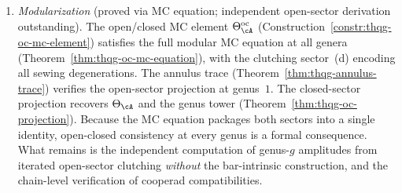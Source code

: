 \begin{enumerate}[label=\textup{(\arabic*)}, leftmargin=3.5em]
\item \emph{Modularization} (proved via MC equation; independent
 open-sector derivation outstanding).
 The open/closed MC element $\Theta^{\mathrm{oc}}_\cA$
 (Construction~\ref{constr:thqg-oc-mc-element}) satisfies the
 full modular MC equation at all genera
 (Theorem~\ref{thm:thqg-oc-mc-equation}), with the clutching
 sector~(d) encoding all sewing degenerations.
 The annulus trace (Theorem~\ref{thm:thqg-annulus-trace}) verifies
 the open-sector projection at genus~$1$. The closed-sector
 projection recovers $\Theta_\cA$ and the genus tower
 (Theorem~\ref{thm:thqg-oc-projection}).
 Because the MC equation packages both sectors into a single
 identity, open-closed consistency at every genus is a formal
 consequence. What remains is the independent computation of
 genus-$g$ amplitudes from iterated open-sector clutching
 \emph{without} the bar-intrinsic construction, and the
 chain-level verification of cooperad compatibilities.
\end{enumerate}

